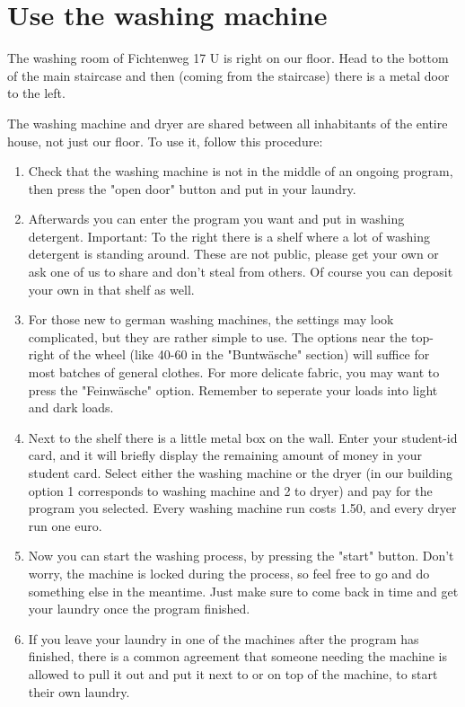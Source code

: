 \section{Use the washing machine}
The washing room of Fichtenweg 17 U is right on our floor. Head to the bottom of the main staircase and then (coming from the staircase) there is a metal door to the left.

The washing machine and dryer are shared between all inhabitants of the entire house, not just our floor. To use it, follow this procedure:
\begin{enumerate}
    \item Check that the washing machine is not in the middle of an ongoing program, then press the "open door" button and put in your laundry.
    
    \item Afterwards you can enter the program you want and put in washing detergent. Important: To the right there is a shelf where a lot of washing detergent is standing around. These are not public, please get your own or ask one of us to share and don't steal from others. Of course you can deposit your own in that shelf as well. 
    
    \item For those new to german washing machines, the settings may look complicated, but they are rather simple to use. The options near the top-right of the wheel (like 40-60 in the "Buntwäsche" section) will suffice for most batches of  general clothes. For more delicate fabric, you may want to press the "Feinwäsche" option. Remember to seperate your loads into light and dark loads.
    
    \item Next to the shelf there is a little metal box on the wall. Enter your student-id card, and it will briefly display the remaining amount of money in your student card. Select either the washing machine or the dryer (in our building option 1 corresponds to washing machine and 2 to dryer) and pay for the program you selected. Every washing machine run costs 1.50, and every dryer run one euro.
    
    \item Now you can start the washing process, by pressing the "start" button. Don't worry, the machine is locked during the process, so feel free to go and do something else in the meantime. Just make sure to come back in time and get your laundry once the program finished.
    
    \item If you leave your laundry in one of the machines after the program has finished, there is a common agreement that someone needing the machine is allowed to pull it out and put it next to or on top of the machine, to start their own laundry.


\end{enumerate}
